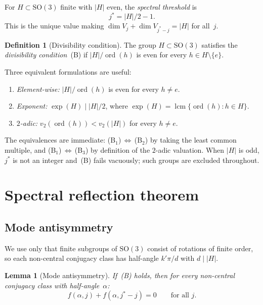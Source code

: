 \documentclass[12pt]{article}
\newtheorem{lemma}[theorem]{Lemma}
\theoremstyle{definition}
\newtheorem{definition}[theorem]{Definition}
\theoremstyle{remark}
\newcommand{\SO}{\mathrm{SO}}
\DeclareMathOperator{\ord}{ord}
\DeclareMathOperator{\lcm}{lcm}
\begin{document}
For $H \subset \SO(3)$ finite with $|H|$ even, the
\emph{spectral threshold} is
\begin{equation}
  \label{eq:threshold}
  j^* = |H|/2 - 1.
\end{equation}
This is the unique value making $\dim V_j + \dim V_{j^*-j} = |H|$
for all~$j$.

\begin{definition}[Divisibility condition]
  \label{def:divisibility}
  The group $H \subset \SO(3)$ satisfies the
  \emph{divisibility condition}~(B) if
  $|H|/\ord(h)$ is even for every
  $h \in H \setminus \{e\}$.
\end{definition}

\noindent
Three equivalent formulations are useful:
\begin{enumerate}
  \item[\textup{(B$_1$)}] \emph{Element-wise:}
    $|H|/\ord(h)$ is even for every $h \neq e$.
  \item[\textup{(B$_2$)}] \emph{Exponent:}
    $\exp(H) \mid |H|/2$, where
    $\exp(H) = \lcm\{\ord(h) : h \in H\}$.
  \item[\textup{(B$_3$)}] \emph{$2$-adic:}
    $v_2(\ord(h)) < v_2(|H|)$ for every $h \neq e$.
\end{enumerate}
The equivalences are immediate:
(B$_1$)$\,\Leftrightarrow\,$(B$_2$) by taking the least common
multiple, and (B$_1$)$\,\Leftrightarrow\,$(B$_3$) by definition
of the $2$-adic valuation.
When $|H|$ is odd, $j^*$ is not an integer and~(B) fails
vacuously; such groups are excluded throughout.

\section{Spectral reflection theorem}
\label{sec:duality}

\subsection{Mode antisymmetry}
\label{sec:antisymmetry}

We use only that finite subgroups of $\SO(3)$ consist of
rotations of finite order, so each non-central conjugacy class
has half-angle $k'\pi/d$ with $d \mid |H|$.

\begin{lemma}[Mode antisymmetry]
  \label{lem:antisymmetry}
  If~\textup{(B)} holds, then for every non-central
  conjugacy class with half-angle~$\alpha$:
  \begin{equation}
    \label{eq:mode-antisymmetry}
    f(\alpha, j) + f(\alpha, j^*{-}j) = 0
    \qquad\text{for all } j.
  \end{equation}
\end{lemma}
\end{document}
